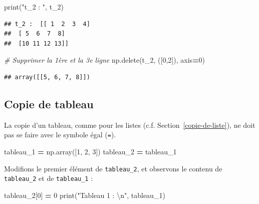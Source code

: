 \documentclass[
  12pt,
]{book}
\newenvironment{Shaded}{\begin{snugshade}}{\end{snugshade}}
\newcommand{\BuiltInTok}[1]{#1}
\newcommand{\CharTok}[1]{\textcolor[rgb]{0.31,0.60,0.02}{#1}}
\newcommand{\CommentTok}[1]{\textcolor[rgb]{0.56,0.35,0.01}{\textit{#1}}}
\newcommand{\DecValTok}[1]{\textcolor[rgb]{0.00,0.00,0.81}{#1}}
\newcommand{\NormalTok}[1]{#1}
\newcommand{\OperatorTok}[1]{\textcolor[rgb]{0.81,0.36,0.00}{\textbf{#1}}}
\newcommand{\StringTok}[1]{\textcolor[rgb]{0.31,0.60,0.02}{#1}}
\numberwithin{equation}{section}
\numberwithin{countremarque}{section}
\begin{document}
\begin{Shaded}
\begin{Highlighting}[]
\BuiltInTok{print}\NormalTok{(}\StringTok{"t\_2 : "}\NormalTok{, t\_2)}
\end{Highlighting}
\end{Shaded}

\begin{lstlisting}
## t_2 :  [[ 1  2  3  4]
##  [ 5  6  7  8]
##  [10 11 12 13]]
\end{lstlisting}

\begin{Shaded}
\begin{Highlighting}[]
\CommentTok{\# Supprimer la 1ère et la 3e ligne}
\NormalTok{np.delete(t\_2, ([}\DecValTok{0}\NormalTok{,}\DecValTok{2}\NormalTok{]), axis}\OperatorTok{=}\DecValTok{0}\NormalTok{)}
\end{Highlighting}
\end{Shaded}

\begin{lstlisting}
## array([[5, 6, 7, 8]])
\end{lstlisting}

\subsection{Copie de tableau}\label{copie-de-tableau}

La copie d'un tableau, comme pour les listes (c.f. Section~\ref{copie-de-liste}), ne doit pas se faire avec le symbole égal (\texttt{=}).

\begin{Shaded}
\begin{Highlighting}[]
\NormalTok{tableau\_1 }\OperatorTok{=}\NormalTok{ np.array([}\DecValTok{1}\NormalTok{, }\DecValTok{2}\NormalTok{, }\DecValTok{3}\NormalTok{])}
\NormalTok{tableau\_2 }\OperatorTok{=}\NormalTok{ tableau\_1}
\end{Highlighting}
\end{Shaded}

Modifions le premier élément de \texttt{tableau\_2}, et observons le contenu de \texttt{tableau\_2} et de \texttt{tableau\_1} :

\begin{Shaded}
\begin{Highlighting}[]
\NormalTok{tableau\_2[}\DecValTok{0}\NormalTok{] }\OperatorTok{=} \DecValTok{0}
\BuiltInTok{print}\NormalTok{(}\StringTok{"Tableau 1 : }\CharTok{\textbackslash{}n}\StringTok{"}\NormalTok{, tableau\_1)}
\end{Highlighting}
\end{Shaded}
\end{document}
